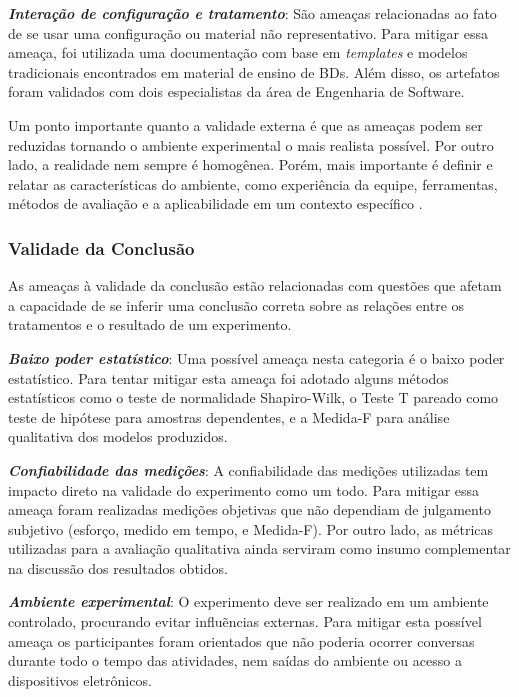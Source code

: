 \textit{\textbf{Interação de configuração e tratamento}}: São ameaças relacionadas ao fato de se usar uma configuração ou material não representativo. 
Para mitigar essa ameaça, foi utilizada uma documentação com base em \textit{templates} e modelos tradicionais encontrados em material de ensino de \acp{BD}. 
Além disso, os artefatos foram validados com dois especialistas da área de Engenharia de Software.

Um ponto importante quanto a validade externa é que as ameaças podem ser reduzidas tornando o ambiente experimental o mais realista possível. 
Por outro lado, a realidade nem sempre é homogênea. 
Porém,  mais importante é definir e relatar as características do ambiente, como experiência da equipe, ferramentas, métodos de avaliação e a aplicabilidade em um contexto específico \cite{Wohlin:2012}.

\subsubsection{Validade da Conclusão}

As ameaças à validade da conclusão estão relacionadas com questões que afetam a capacidade de se inferir uma conclusão correta sobre as relações entre os tratamentos e o resultado de um experimento.

\textit{\textbf{Baixo poder estatístico}}: Uma possível ameaça nesta categoria é o baixo poder estatístico.
Para tentar mitigar esta ameaça foi adotado alguns métodos estatísticos como o teste de normalidade Shapiro-Wilk, o Teste T pareado como teste de hipótese para amostras dependentes, e a Medida-F para análise qualitativa dos modelos produzidos.

\textit{\textbf{Confiabilidade das medições}}: A confiabilidade das medições utilizadas tem impacto direto na validade do experimento como um todo. Para mitigar essa ameaça foram realizadas medições objetivas que não dependiam de julgamento subjetivo (esforço, medido em tempo, e Medida-F). 
Por outro lado, as métricas utilizadas para a avaliação qualitativa ainda serviram como insumo complementar na discussão dos resultados obtidos.

\textit{\textbf{Ambiente experimental}}: O experimento deve ser realizado em um ambiente controlado, procurando evitar influẽncias externas. Para mitigar esta possível ameaça os
participantes foram orientados que não poderia ocorrer conversas durante todo o tempo das atividades, nem saídas do ambiente ou acesso a dispositivos eletrônicos.


